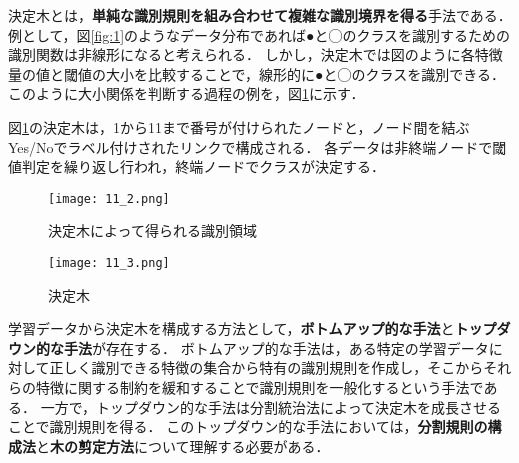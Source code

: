 \documentclass[dvipdfmx]{jreport}
\begin{document}
決定木とは，\textbf{単純な識別規則を組み合わせて複雑な識別境界を得る}手法である．
例として，図\ref{fig:1}のようなデータ分布であれば●と◯のクラスを識別するための識別関数は非線形になると考えられる．
しかし，決定木では図のように各特徴量の値と閾値の大小を比較することで，線形的に●と◯のクラスを識別できる．
このように大小関係を判断する過程の例を，図\ref{fig:2}に示す．

図\ref{fig:2}の決定木は，1から11まで番号が付けられたノードと，ノード間を結ぶYes/Noでラベル付けされたリンクで構成される．
各データは非終端ノードで閾値判定を繰り返し行われ，終端ノードでクラスが決定する．

\begin{figure}[h]
    \centering
    \begin{minipage}[b]{0.49\columnwidth}
        \centering
        \texttt{[image: 11\_2.png]}
        \caption{決定木によって得られる識別領域}\label{fig:1}
    \end{minipage}
    \centering
    \begin{minipage}[b]{0.49\columnwidth}
        \centering
        \texttt{[image: 11\_3.png]}
        \caption{決定木}\label{fig:2}
    \end{minipage}
\end{figure}

学習データから決定木を構成する方法として，\textbf{ボトムアップ的な手法}と\textbf{トップダウン的な手法}が存在する．
ボトムアップ的な手法は，ある特定の学習データに対して正しく識別できる特徴の集合から特有の識別規則を作成し，そこからそれらの特徴に関する制約を緩和することで識別規則を一般化するという手法である．
一方で，トップダウン的な手法は分割統治法によって決定木を成長させることで識別規則を得る．
このトップダウン的な手法においては，\textbf{分割規則の構成法}と\textbf{木の剪定方法}について理解する必要がある．

\end{document}
